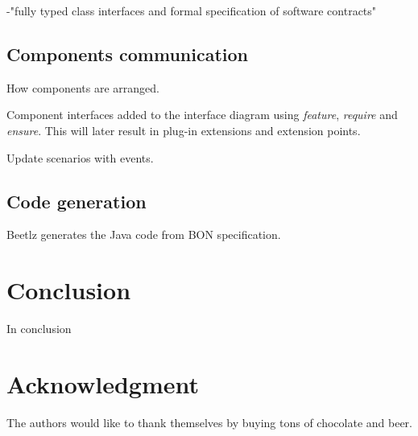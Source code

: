 \documentclass[conference]{IEEEtran}
\begin{document}
-"fully typed class interfaces and formal specification of software contracts"

%
\subsection{Components communication}
\label{sec:comp-comm}

How components are arranged.

Component interfaces added to the interface diagram using
\emph{feature}, \emph{require} and \emph{ensure}. This will later
result in plug-in extensions and extension points.

Update scenarios with events.

%
\subsection{Code generation}
\label{sec:code-generation}

Beetlz generates the Java code from BON specification.

\section{Conclusion}
\label{sec:conclusion}

In conclusion


\section*{Acknowledgment}
\label{sec:acknowledgment}

The authors would like to thank themselves by buying tons of chocolate
and beer.


\end{document}
